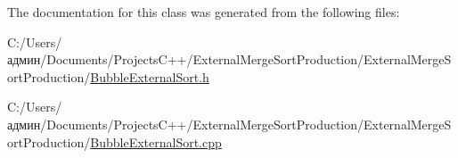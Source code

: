 The documentation for this class was generated from the following files\+:\begin{DoxyCompactItemize}
\item 
C\+:/\+Users/админ/\+Documents/\+Projects\+C++/\+External\+Merge\+Sort\+Production/\+External\+Merge\+Sort\+Production/\hyperlink{_bubble_external_sort_8h}{Bubble\+External\+Sort.\+h}\item 
C\+:/\+Users/админ/\+Documents/\+Projects\+C++/\+External\+Merge\+Sort\+Production/\+External\+Merge\+Sort\+Production/\hyperlink{_bubble_external_sort_8cpp}{Bubble\+External\+Sort.\+cpp}\end{DoxyCompactItemize}
